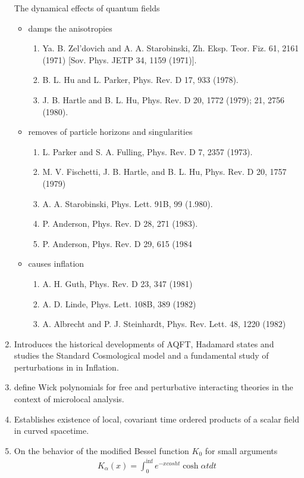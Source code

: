 \begin{enumerate}
The dynamical effects of quantum fields
\begin{itemize}
    \item damps the anisotropies
    \begin{enumerate}
        \item  Ya. B. Zel'dovich and A. A. Starobinski, Zh. Eksp. Teor. Fiz. 61, 2161 (1971) [Sov. Phys. JETP 34, 1159 (1971)].
\item B. L. Hu and L. Parker, Phys. Rev. D 17, 933 (1978).
\item J. B. Hartle and B. L. Hu, Phys. Rev. D 20, 1772 (1979); 21, 2756 (1980).
    \end{enumerate}
\item removes of particle horizons and singularities 
\begin{enumerate}
    \item L. Parker and S. A. Fulling, Phys. Rev. D 7, 2357 (1973).
    \item M. V. Fischetti, J. B. Hartle, and B. L. Hu, Phys. Rev. D 20, 1757 (1979) 
    \item A. A. Starobinski, Phys. Lett. 91B, 99 (1.980).
    \item P. Anderson, Phys. Rev. D 28, 271 (1983).
    \item P. Anderson, Phys. Rev. D 29, 615 (1984 
\end{enumerate}
\item causes inflation
\begin{enumerate}
    \item A. H. Guth, Phys. Rev. D 23, 347 (1981)
    \item A. D. Linde, Phys. Lett. 108B, 389 (1982)
    \item A. Albrecht and P. J. Steinhardt, Phys. Rev. Lett. 48, 1220 (1982)
\end{enumerate}
\end{itemize}

\item \cite{hack2015cosmologicalapplicationsalgebraicquantum} Introduces the historical developments of AQFT, Hadamard states and studies the Standard Cosmological model and a fundamental study of perturbations in in Inflation.

\item \cite{Brunetti1996, Brunetti2000} define Wick polynomials for free and perturbative interacting theories in the context of microlocal analysis.

\item \cite{Hollands_2002} Establishes existence of local, covariant time ordered products of a scalar field in curved spacetime.

\item \cite{abramowitz+stegun} On the behavior of the modified Bessel function $K_0$ for small arguments
\begin{align}
    K_\alpha(x) = \int_0^\inf e^{-x cosh t} \cosh \alpha t dt
\end{align}

\end{enumerate}
